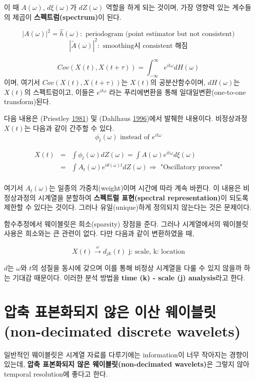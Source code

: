 \documentclass[b5paper,]{book}
\theoremstyle{definition}
\theoremstyle{definition}
\theoremstyle{definition}
\theoremstyle{remark}
\begin{document}
이 때 \(A(\omega)\), \(d\xi(\omega)\)가 \(dZ(\omega)\) 역할을 하게 되는
것이며, 가장 영향력 있는 계수들의 제곱이 \textbf{스펙트럼(spectrum)}이
된다.

\[|A(\omega)|^{2}=\hat{h}(\omega): \text{ periodogram (point estimator but not consistent)}\]
\[|\tilde{A}(\omega)|^{2}: \text{ smoothing시 consistent 해짐}\]

\[Cov(X(t), X(t+\tau))=\int_{-\infty}^{\infty}e^{it\omega}dH(\omega)\]
이며, 여기서 \(Cov(X(t), X(t+\tau))\)는 \(X(t)\)의 공분산함수이며,
\(dH(\omega)\)는 \(X(t)\)의 스펙트럼이고, 이들은 \(e^{it\omega}\) 라는
푸리에변환을 통해 일대일변환(one-to-one transform)된다.

다음 내용은 (Priestley \protect\hyperlink{ref-Priestley1981}{1981}) 및
(Dahlhaus \protect\hyperlink{ref-Dahlhaus1996}{1996})에서 발췌한
내용이다. 비정상과정 \(X(t)\)는 다음과 같이 간주할 수 있다.
\[\phi_{t}(\omega) \text{ instead of } e^{it\omega}\]

\begin{eqnarray*}
X(t)&=&\int \phi_{t}(\omega)dZ(\omega)=\int A(\omega)e^{it\omega}d\xi(\omega)\\
&=&\int A_{t}(\omega)e^{i\theta(\omega)t}dZ(\omega) \Longrightarrow \text{ "Oscillatory process"}\\
\end{eqnarray*}

여기서 \(A_{t}(\omega)\)는 일종의 가중치(weight)이며 시간에 따라 계속
바뀐다. 이 내용은 비정상과정의 시계열을 분할하여 \textbf{스펙트럴
표현(spectral representation)}이 되도록 제한할 수 있다는 것이다. 그러나
유일(unique)하게 정의되지 않는다는 것은 문제이다.

함수추정에서 웨이블릿은 희소(sparsity) 장점을 준다. 그러나 시계열에서의
웨이블릿 사용은 희소와는 큰 관련이 없다. 다만 다음과 같이 변환하였을 때,

\[X(t) \stackrel{\omega}{\rightarrow}d_{jk}(t) \text{ j: scale, k: location}\]

\(d\)는 \(\omega\)와 \(t\)의 성질을 동시에 갖으며 이를 통해 비정상
시계열을 다룰 수 있지 않을까 하는 기대감 때문이다. 이러한 분석 방법을
\textbf{time (k) - scale (j) analysis}라고 한다.

\section{압축 표본화되지 않은 이산 웨이블릿(non-decimated discrete
wavelets)}\label{----non-decimated-discrete-wavelets}

일반적인 웨이블릿은 시계열 자료를 다루기에는 information이 너무 작아지는
경향이 있는데, \textbf{압축 표본화되지 않은 웨이블릿(non-decimated
wavelets)}은 그렇지 않아 temporal resolution에 좋다고 한다.
\end{document}
